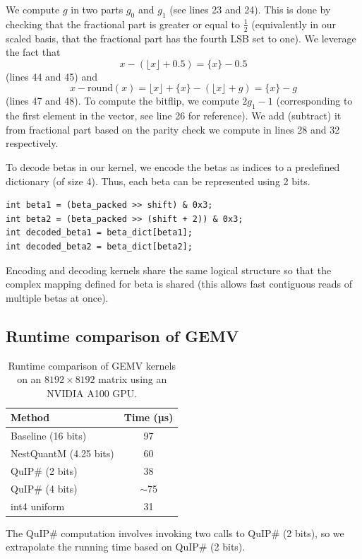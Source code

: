 \documentclass{article}
\theoremstyle{plain}
\theoremstyle{definition}
\theoremstyle{remark}
\begin{document}
We compute $g$ in two parts $g_0$ and $g_1$ (see lines 23 and 24). This is done by checking that the fractional part is greater or equal to $\frac{1}{2}$ (equivalently in our scaled basis, that the fractional part has the fourth LSB set to one). We leverage the fact that  $$x-(\lfloor x\rfloor + 0.5)=\{x\}-0.5$$ (lines 44 and 45)
and $$x-\mathrm{round}(x)=\lfloor x\rfloor+\{x\}-(\lfloor x\rfloor + g)=\{x\}-g$$ (lines 47 and 48). To compute the bitflip, we compute $2 g_1 - 1$ (corresponding to the first element in the vector, see line 26 for reference). We add (subtract) it from fractional part based on the parity check we compute in lines 28 and 32 respectively.

To decode betas in our kernel, we encode the betas as indices to a predefined dictionary (of size 4). Thus, each beta can be represented using 2 bits.
\begin{lstlisting}
int beta1 = (beta_packed >> shift) & 0x3;
int beta2 = (beta_packed >> (shift + 2)) & 0x3;
int decoded_beta1 = beta_dict[beta1];
int decoded_beta2 = beta_dict[beta2];
\end{lstlisting}
Encoding and decoding kernels share the same logical structure so that the complex mapping defined for beta is shared (this allows fast contiguous reads of multiple betas at once). 

\subsection{Runtime comparison of GEMV}
\label{subsec:runtime}
\begin{table}[ht]
\centering
\caption{Runtime comparison of GEMV kernels on an $8192 \times 8192$ matrix using an NVIDIA A100 GPU.}
\label{tab:gemv-runtime}
\begin{tabular}{@{}l c@{}}
\toprule
\textbf{Method} & \textbf{Time (µs)} \\
\midrule
Baseline (16 bits)     & 97  \\
NestQuantM (4.25 bits) & 60  \\
QuIP\# (2 bits)        & 38  \\
QuIP\# (4 bits)        & $\sim$75 \\
int4 uniform           & 31  \\
\bottomrule
\end{tabular}
\end{table}
The QuIP\# computation involves invoking two calls to QuIP\# (2 bits), so we extrapolate the running time based on QuIP\# (2 bits).
\end{document}
